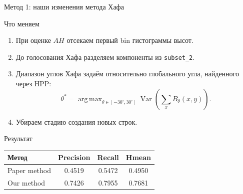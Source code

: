 \documentclass[12pt,pdf,hyperref={unicode}]{beamer}
\newcommand{\argmax}{\mathop{\mathrm{arg\,max}}}
\begin{document}
\begin{frame}{Метод 1: наши изменения метода Хафа}

\small

\begin{block}{Что меняем}
\begin{enumerate}
    \item При оценке $AH$ отсекаем первый bin гистограммы высот.
    \item До голосования Хафа разделяем компоненты из \texttt{subset\_2}.
    \item Диапазон углов Хафа задаём относительно глобального угла, найденного через HPP:
    \[
    \theta^*=\argmax_{\theta\in[-30^\circ,30^\circ]}
    \operatorname{Var}\left(\sum_x B_\theta(x,y)\right).
    \]
    \item Убираем стадию создания новых строк.
\end{enumerate}
\end{block}

\vspace{1mm}

\begin{block}{Результат}
\centering
\scriptsize
\begin{tabular}{|l|c|c|c|}
\hline
Метод & Precision & Recall & Hmean \\
\hline
Paper method & 0.4519 & 0.5472 & 0.4950 \\
Our method   & 0.7426 & 0.7955 & 0.7681 \\
\hline
\end{tabular}
\end{block}

\end{frame}
\end{document}
